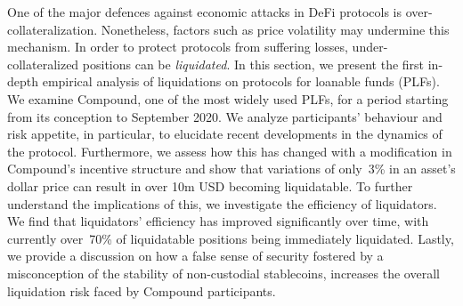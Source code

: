 One of the major defences against economic attacks in DeFi protocols is over-collateralization.
Nonetheless, factors such as price volatility may undermine this mechanism.
In order to protect protocols from suffering losses, under-collateralized positions can be \textit{liquidated}.
In this section, we present the first in-depth empirical analysis of liquidations on protocols for loanable funds (PLFs).
We examine Compound, one of the most widely used PLFs, for a period starting from its conception to September 2020.
We analyze participants' behaviour and risk appetite, in particular, to elucidate recent developments in the dynamics of the protocol.
Furthermore, we assess how this has changed with a modification in Compound's incentive structure and show that variations of only~3\% in an asset's dollar price can result in over 10m USD becoming liquidatable.
To further understand the implications of this, we investigate the efficiency of liquidators.
We find that liquidators' efficiency has improved significantly over time, with currently over~70\% of liquidatable positions being immediately liquidated.
Lastly, we provide a discussion on how a false sense of security fostered by a misconception of the stability of non-custodial stablecoins, increases the overall liquidation risk faced by Compound participants.
